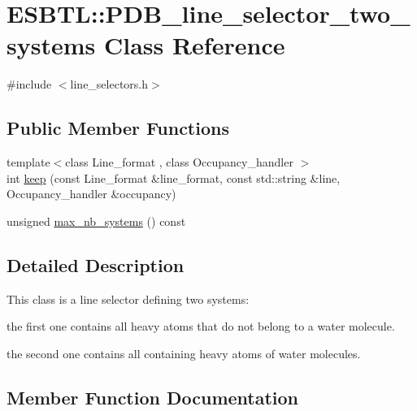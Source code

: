 \hypertarget{classESBTL_1_1PDB__line__selector__two__systems}{}\section{E\+S\+B\+TL\+:\+:P\+D\+B\+\_\+line\+\_\+selector\+\_\+two\+\_\+systems Class Reference}
\label{classESBTL_1_1PDB__line__selector__two__systems}


{\ttfamily \#include $<$line\+\_\+selectors.\+h$>$}

\subsection*{Public Member Functions}
\begin{DoxyCompactItemize}
\item 
{\footnotesize template$<$class Line\+\_\+format , class Occupancy\+\_\+handler $>$ }\\int \hyperlink{classESBTL_1_1PDB__line__selector__two__systems_aee21ebd29d905a50812be12ab434d342}{keep} (const Line\+\_\+format \&line\+\_\+format, const std\+::string \&line, Occupancy\+\_\+handler \&occupancy)
\item 
unsigned \hyperlink{classESBTL_1_1PDB__line__selector__two__systems_acaf518ddf669d4ceeb4fce3a6a5bb75a}{max\+\_\+nb\+\_\+systems} () const
\end{DoxyCompactItemize}


\subsection{Detailed Description}
This class is a line selector defining two systems\+:
\begin{DoxyItemize}
\item the first one contains all heavy atoms that do not belong to a water molecule.
\item the second one contains all containing heavy atoms of water molecules. 
\end{DoxyItemize}

\subsection{Member Function Documentation}
\mbox{\label{classESBTL_1_1PDB__line__selector__two__systems_aee21ebd29d905a50812be12ab434d342}} 
